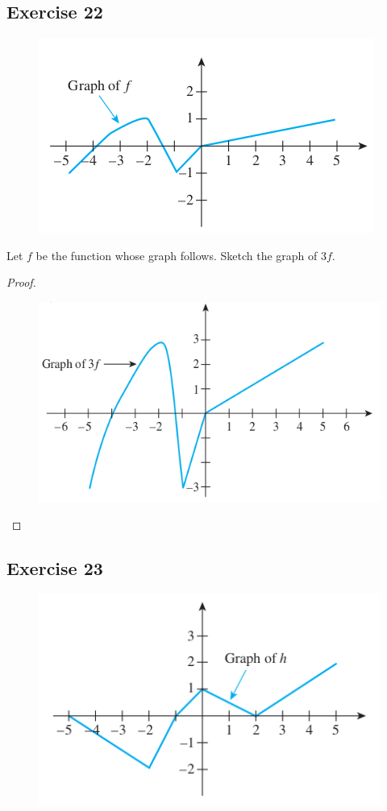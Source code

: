 \documentclass[14pt]{extarticle}
\begin{document}
\subsection{Exercise 22}
\begin{figure}[ht!]
\centering
\includegraphics[scale=0.5]{../images/11.1.22.png}
\end{figure}

Let \(f\) be the function whose graph follows. Sketch the graph of \(3f\).

\begin{proof}
\begin{figure}[ht!]
\centering
\includegraphics[scale=0.5]{../images/11.1.22.2.png}
\end{figure}
\end{proof}

\subsection{Exercise 23}
\begin{figure}[ht!]
\centering
\includegraphics[scale=0.5]{../images/11.1.23.png}
\end{figure}
\end{document}
